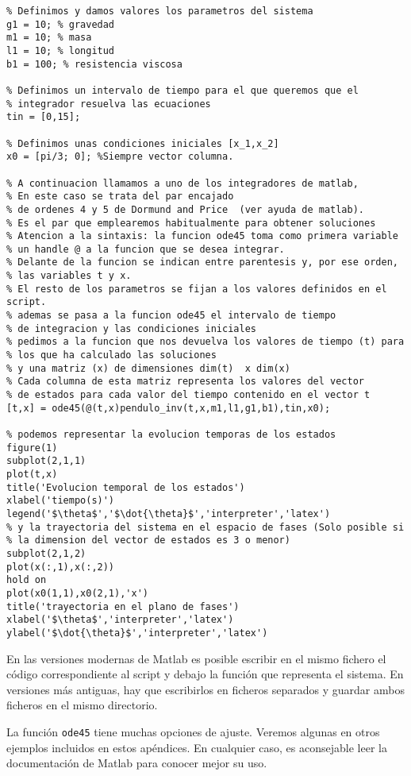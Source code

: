 \begin{lstlisting}
% Definimos y damos valores los parametros del sistema
g1 = 10; % gravedad
m1 = 10; % masa
l1 = 10; % longitud
b1 = 100; % resistencia viscosa

% Definimos un intervalo de tiempo para el que queremos que el
% integrador resuelva las ecuaciones
tin = [0,15];

% Definimos unas condiciones iniciales [x_1,x_2]
x0 = [pi/3; 0]; %Siempre vector columna.

% A continuacion llamamos a uno de los integradores de matlab, 
% En este caso se trata del par encajado 
% de ordenes 4 y 5 de Dormund and Price  (ver ayuda de matlab). 
% Es el par que emplearemos habitualmente para obtener soluciones
% Atencion a la sintaxis: la funcion ode45 toma como primera variable
% un handle @ a la funcion que se desea integrar. 
% Delante de la funcion se indican entre parentesis y, por ese orden,
% las variables t y x.  
% El resto de los parametros se fijan a los valores definidos en el script.
% ademas se pasa a la funcion ode45 el intervalo de tiempo
% de integracion y las condiciones iniciales  
% pedimos a la funcion que nos devuelva los valores de tiempo (t) para 
% los que ha calculado las soluciones
% y una matriz (x) de dimensiones dim(t)  x dim(x) 
% Cada columna de esta matriz representa los valores del vector
% de estados para cada valor del tiempo contenido en el vector t
[t,x] = ode45(@(t,x)pendulo_inv(t,x,m1,l1,g1,b1),tin,x0);

% podemos representar la evolucion temporas de los estados
figure(1)
subplot(2,1,1)
plot(t,x)
title('Evolucion temporal de los estados')
xlabel('tiempo(s)')
legend('$\theta$','$\dot{\theta}$','interpreter','latex')
% y la trayectoria del sistema en el espacio de fases (Solo posible si 
% la dimension del vector de estados es 3 o menor)
subplot(2,1,2)
plot(x(:,1),x(:,2))
hold on
plot(x0(1,1),x0(2,1),'x')
title('trayectoria en el plano de fases')
xlabel('$\theta$','interpreter','latex')
ylabel('$\dot{\theta}$','interpreter','latex')
\end{lstlisting}

En las versiones modernas de Matlab es posible escribir en el mismo fichero el código correspondiente al script  y debajo  la función que representa el sistema. En versiones más antiguas, hay que escribirlos en ficheros separados y guardar ambos ficheros en el mismo directorio.

La función \texttt{ode45} tiene muchas opciones de ajuste. Veremos algunas en otros ejemplos incluidos en estos apéndices. En cualquier caso, es aconsejable leer la documentación de Matlab para conocer mejor su uso.


